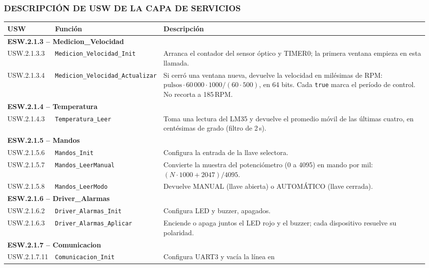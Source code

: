 \subsubsection{DESCRIPCIÓN DE USW DE LA CAPA DE SERVICIOS}

\begin{longtable}{|p{2.4cm}|p{4.6cm}|p{7.6cm}|}
\hline
\textbf{USW} & \textbf{Función} & \textbf{Descripción} \\ \hline
\endhead
\multicolumn{3}{|l|}{\textbf{ESW.2.1.3 -- Medicion\_Velocidad}} \\ \hline
USW.2.1.3.3 & \texttt{Medicion\_Velocidad\_\-Init} & Arranca el contador del sensor óptico
y TIMER0; la primera ventana empieza en esta llamada. \\ \hline
USW.2.1.3.4 & \texttt{Medicion\_Velocidad\_\-Actualizar} & Si cerró una ventana nueva,
devuelve la velocidad en milésimas de RPM: $\mathrm{pulsos} \cdot 60\,000 \cdot 1000 / (60
\cdot 500)$, en 64 bits. Cada \texttt{true} marca el período de control. No recorta a
185\,RPM. \\ \hline
\multicolumn{3}{|l|}{\textbf{ESW.2.1.4 -- Temperatura}} \\ \hline
USW.2.1.4.3 & \texttt{Temperatura\_Leer} & Toma una lectura del LM35 y devuelve el
promedio móvil de las últimas cuatro, en centésimas de grado (filtro de 2\,s). \\ \hline
\multicolumn{3}{|l|}{\textbf{ESW.2.1.5 -- Mandos}} \\ \hline
USW.2.1.5.6 & \texttt{Mandos\_Init} & Configura la entrada de la llave selectora. \\ \hline
USW.2.1.5.7 & \texttt{Mandos\_LeerManual} & Convierte la muestra del potenciómetro (0 a
4095) en mando por mil: $(N \cdot 1000 + 2047) / 4095$. \\ \hline
USW.2.1.5.8 & \texttt{Mandos\_LeerModo} & Devuelve MANUAL (llave abierta) o AUTOMÁTICO
(llave cerrada). \\ \hline
\multicolumn{3}{|l|}{\textbf{ESW.2.1.6 -- Driver\_Alarmas}} \\ \hline
USW.2.1.6.2 & \texttt{Driver\_Alarmas\_Init} & Configura LED y buzzer, apagados. \\ \hline
USW.2.1.6.3 & \texttt{Driver\_Alarmas\_\-Aplicar} & Enciende o apaga juntos el LED rojo y el
buzzer; cada dispositivo resuelve su polaridad. \\ \hline
\multicolumn{3}{|l|}{\textbf{ESW.2.1.7 -- Comunicacion}} \\ \hline
USW.2.1.7.11 & \texttt{Comunicacion\_Init} & Configura UART3 y vacía la línea en

\end{longtable}
